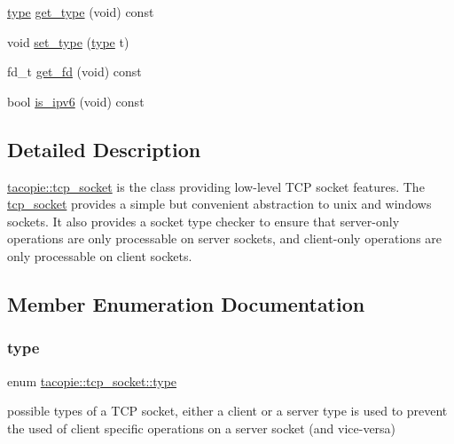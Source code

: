 \begin{DoxyCompactItemize}
\item 
\hyperlink{classtacopie_1_1tcp__socket_ad8376e85df96ab9523f5d079ed7172ab}{type} \hyperlink{classtacopie_1_1tcp__socket_a4f663be51b845520505bc20a88b411ee}{get\+\_\+type} (void) const
\item 
void \hyperlink{classtacopie_1_1tcp__socket_a89be86ab254eec3fc16eedfba8b16fb2}{set\+\_\+type} (\hyperlink{classtacopie_1_1tcp__socket_ad8376e85df96ab9523f5d079ed7172ab}{type} t)
\item 
fd\+\_\+t \hyperlink{classtacopie_1_1tcp__socket_a4fd367a1802ed6ae7fa0e33fc07ed255}{get\+\_\+fd} (void) const
\item 
bool \hyperlink{classtacopie_1_1tcp__socket_a6d9933c767572b03fbb4b5ced4bd1fc4}{is\+\_\+ipv6} (void) const
\end{DoxyCompactItemize}


\subsection{Detailed Description}
\hyperlink{classtacopie_1_1tcp__socket}{tacopie\+::tcp\+\_\+socket} is the class providing low-\/level T\+CP socket features. The \hyperlink{classtacopie_1_1tcp__socket}{tcp\+\_\+socket} provides a simple but convenient abstraction to unix and windows sockets. It also provides a socket type checker to ensure that server-\/only operations are only processable on server sockets, and client-\/only operations are only processable on client sockets. 

\subsection{Member Enumeration Documentation}
\mbox{\label{classtacopie_1_1tcp__socket_ad8376e85df96ab9523f5d079ed7172ab}} 
\subsubsection{\texorpdfstring{type}{type}}
{\footnotesize\ttfamily enum \hyperlink{classtacopie_1_1tcp__socket_ad8376e85df96ab9523f5d079ed7172ab}{tacopie\+::tcp\+\_\+socket\+::type}\hspace{0.3cm}{\ttfamily [strong]}}

possible types of a T\+CP socket, either a client or a server type is used to prevent the used of client specific operations on a server socket (and vice-\/versa)

